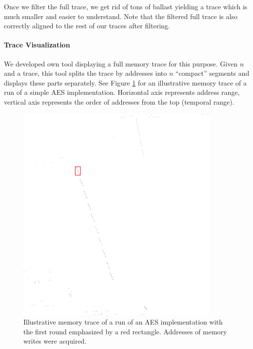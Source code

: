 	\begin{note}
	\label{note:fullfilter}
		Once we filter the full trace, we get rid of tons of ballast yielding a trace which is much smaller and easier to understand. Note that the filtered full trace is also correctly aligned to the rest of our traces after filtering.
	\end{note}
	
	\paragraph{Trace Visualization}
		
		We developed own tool displaying a full memory trace for this purpose. Given $n$ and a trace, this tool splits the trace by addresses into $n$ ``compact'' segments and displays these parts separately. See Figure \ref{fig:memtrace} for an illustrative memory trace of a run of a simple AES implementation. Horizontal axis represents address range, vertical axis represents the order of addresses from the top (temporal range).
		
		\begin{figure}[h!] %
		\begin{center}
			\includegraphics[width=0.9\textwidth]{./figures/memtrace/memtrace_emph.png}
			\caption{Illustrative memory trace of a run of an AES implementation with the first round emphasized by a red rectangle. Addresses of memory writes were acquired.}
			\label{fig:memtrace}
		\end{center}
		\end{figure}
		
